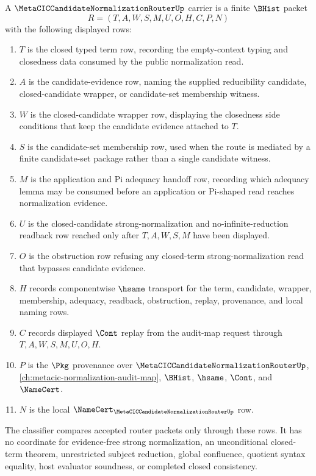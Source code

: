 \begin{definition}
\label{def:metacic-candidate-normalization-router-carrier}
A $\MetaCICCandidateNormalizationRouterUp$ carrier is a finite $\BHist$ packet
$$
R=(T,A,W,S,M,U,O,H,C,P,N)
$$
with the following displayed rows:
\begin{enumerate}
\item $T$ is the closed typed term row, recording the empty-context typing and closedness data consumed by the public normalization read.
\item $A$ is the candidate-evidence row, naming the supplied reducibility candidate, closed-candidate wrapper, or candidate-set membership witness.
\item $W$ is the closed-candidate wrapper row, displaying the closedness side conditions that keep the candidate evidence attached to $T$.
\item $S$ is the candidate-set membership row, used when the route is mediated by a finite candidate-set package rather than a single candidate witness.
\item $M$ is the application and Pi adequacy handoff row, recording which adequacy lemma may be consumed before an application or Pi-shaped read reaches normalization evidence.
\item $U$ is the closed-candidate strong-normalization and no-infinite-reduction readback row reached only after $T,A,W,S,M$ have been displayed.
\item $O$ is the obstruction row refusing any closed-term strong-normalization read that bypasses candidate evidence.
\item $H$ records componentwise $\hsame$ transport for the term, candidate, wrapper, membership, adequacy, readback, obstruction, replay, provenance, and local naming rows.
\item $C$ records displayed $\Cont$ replay from the audit-map request through $T,A,W,S,M,U,O,H$.
\item $P$ is the $\Pkg$ provenance over $\MetaCICCandidateNormalizationRouterUp$, \autoref{ch:metacic-normalization-audit-map}, $\BHist$, $\hsame$, $\Cont$, and $\NameCert$.
\item $N$ is the local $\NameCert_{\MetaCICCandidateNormalizationRouterUp}$ row.
\end{enumerate}
The classifier compares accepted router packets only through these rows. It has no coordinate for evidence-free strong normalization, an unconditional closed-term theorem, unrestricted subject reduction, global confluence, quotient syntax equality, host evaluator soundness, or completed closed consistency.
\end{definition}

